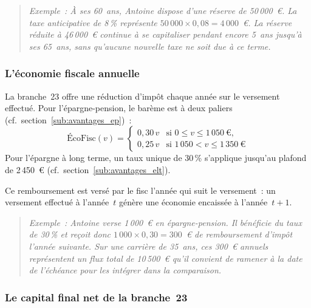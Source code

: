 ﻿\documentclass[12pt, a4paper]{article}
\begin{document}
\begin{quote}
\textit{Exemple~: À ses 60~ans, Antoine dispose d'une réserve de 50\,000~€.
La taxe anticipative de 8\,\% représente $50\,000 \times 0{,}08 = 4\,000$~€.
La réserve réduite à 46\,000~€ continue à se capitaliser pendant encore
5~ans jusqu'à ses 65~ans, sans qu'aucune nouvelle taxe ne soit due à ce terme.}
\end{quote}

\subsubsection*{L'économie fiscale annuelle}
\label{sub:eco_fisc_b23}

La branche~23 offre une réduction d'impôt chaque année sur le versement
effectué. Pour l'épargne-pension, le barème est à deux paliers (cf.~section~\ref{sub:avantages_ep})~:
\begin{equation}
  \text{ÉcoFisc}(v)=
  \begin{cases}
    0{,}30\,v & \text{si } 0 \le v \le 1\,050~\text{€}, \\
    0{,}25\,v & \text{si } 1\,050 < v \le 1\,350~\text{€}
  \end{cases}
\end{equation}
Pour l'épargne à long terme, un taux unique de 30\,\% s'applique jusqu'au
plafond de 2\,450~€ (cf.~section~\ref{sub:avantages_elt}).

Ce remboursement est versé par le fisc l'année qui
suit le versement~: un versement effectué à l'année~$t$ génère une économie
encaissée à l'année~$t+1$.

\begin{quote}
\textit{Exemple~: Antoine verse 1\,000~€ en épargne-pension. Il bénéficie
du taux de 30\,\% et reçoit donc $1\,000 \times 0{,}30 = 300$~€ de
remboursement d'impôt l'année suivante. Sur une carrière de 35~ans, ces
300~€ annuels représentent un flux total de 10\,500~€ qu'il convient de
ramener à la date de l'échéance pour les intégrer dans la comparaison.}
\end{quote}

\subsubsection*{Le capital final net de la branche~23}
\label{sub:va_b23}
\end{document}
